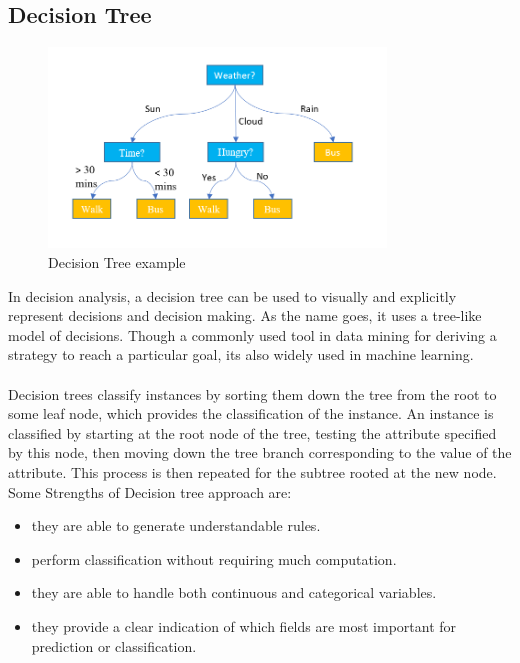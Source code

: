 \subsection*{Decision Tree}
\begin{figure}[!ht]
	\centering
	\includegraphics[width=0.8\textwidth]{images/decision-tree.png}
	\caption{Decision Tree example}
	\centering
	\label{label:decision-tree}
\end{figure}
In decision analysis, a decision tree can be used to visually and explicitly represent decisions and decision making. As the name goes, it uses a tree-like model of decisions. Though a commonly used tool in data mining for deriving a strategy to reach a particular goal, its also widely used in machine learning.\\
\\
Decision trees classify instances by sorting them down the tree from the root to some leaf node, which provides the classification of the instance. An instance is classified by starting at the root node of the tree, testing the attribute specified by this node, then moving down the tree branch corresponding to the value of the attribute. This process is then repeated for the subtree rooted at the new node.\\
Some Strengths of Decision tree approach are:
\begin{itemize}
    \item they are able to generate understandable rules.
    \item perform classification without requiring much computation.
    \item they are able to handle both continuous and categorical variables.
    \item they provide a clear indication of which fields are most important for prediction or classification.
\end{itemize}

